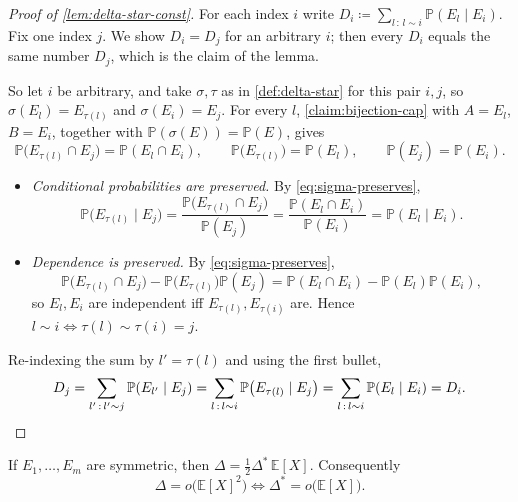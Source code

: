 \begin{proof}[Proof of \autoref{lem:delta-star-const}]
    For each index \(i\) write \(D_i \coloneqq \sum_{l \,:\, l \sim i} \mathbb{P}(E_l \mid E_i)\). Fix one index \(j\). We show \(D_i = D_j\) for an arbitrary \(i\); then every \(D_i\) equals the same number \(D_j\), which is the claim of the lemma.

    So let \(i\) be arbitrary, and take \(\sigma, \tau\) as in \autoref{def:delta-star} for this pair \(i, j\), so \(\sigma(E_l) = E_{\tau(l)}\) and \(\sigma(E_i) = E_j\). For every \(l\), \autoref{claim:bijection-cap} with \(A = E_l\), \(B = E_i\), together with \(\mathbb{P}(\sigma(E)) = \mathbb{P}(E)\), gives
    \begin{equation}\label{eq:sigma-preserves}
        \mathbb{P}\bigl( E_{\tau(l)} \cap E_j \bigr) = \mathbb{P}(E_l \cap E_i),
        \qquad
        \mathbb{P}\bigl( E_{\tau(l)} \bigr) = \mathbb{P}(E_l),
        \qquad
        \mathbb{P}(E_j) = \mathbb{P}(E_i).
    \end{equation}
    \begin{itemize}
        \item \emph{Conditional probabilities are preserved.} By \eqref{eq:sigma-preserves},
        \[
            \mathbb{P}\bigl( E_{\tau(l)} \mid E_j \bigr)
            = \frac{\mathbb{P}\bigl( E_{\tau(l)} \cap E_j \bigr)}{\mathbb{P}(E_j)}
            = \frac{\mathbb{P}(E_l \cap E_i)}{\mathbb{P}(E_i)}
            = \mathbb{P}(E_l \mid E_i).
        \]
        \item \emph{Dependence is preserved.} By \eqref{eq:sigma-preserves},
        \[
            \mathbb{P}\bigl( E_{\tau(l)} \cap E_j \bigr) - \mathbb{P}\bigl( E_{\tau(l)} \bigr)\mathbb{P}(E_j)
            = \mathbb{P}(E_l \cap E_i) - \mathbb{P}(E_l)\mathbb{P}(E_i),
        \]
        so \(E_l, E_i\) are independent iff \(E_{\tau(l)}, E_{\tau(i)}\) are. Hence \(l \sim i \iff \tau(l) \sim \tau(i) = j\).
    \end{itemize}
    Re-indexing the sum by \(l' = \tau(l)\) and using the first bullet,
    \[
        D_j = \sum_{l' \,:\, l' \sim j} \mathbb{P}(E_{l'} \mid E_j)
        = \sum_{l \,:\, l \sim i} \mathbb{P}\bigl( E_{\tau(l)} \mid E_j \bigr)
        = \sum_{l \,:\, l \sim i} \mathbb{P}(E_l \mid E_i) = D_i. \qedhere
    \]
\end{proof}

\begin{lemma}\label{lem:delta-star}
    If \(E_1, \ldots, E_m\) are symmetric, then \(\Delta = \frac{1}{2}\Delta^{*} \, \mathbb{E}[X]\). Consequently
    \[
        \Delta = o\bigl( \mathbb{E}[X]^{2} \bigr) \iff \Delta^{*} = o\bigl( \mathbb{E}[X] \bigr).
    \]
\end{lemma}

